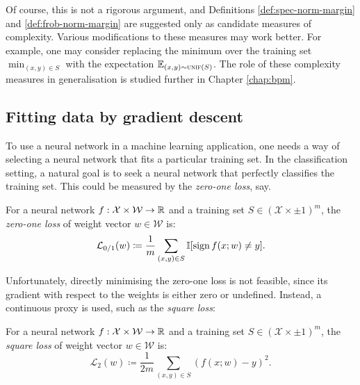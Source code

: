 \begin{refsection}
Of course, this is not a rigorous argument, and Definitions \ref{def:spec-norm-margin} and \ref{def:frob-norm-margin} are suggested only as candidate measures of complexity. Various modifications to these measures may work better. For example, one may consider replacing the minimum over the training set $\min_{(x,y)\in S}$ with the expectation $\operatorname{\mathbb{E}}_{(x,y)\sim\textsc{unif}(S)}$. The role of these complexity measures in generalisation is studied further in Chapter \ref{chap:bpm}.

\subsection{Fitting data by gradient descent}

To use a neural network in a machine learning application, one needs a way of selecting a neural network that fits a particular training set. In the classification setting, a natural goal is to seek a neural network that perfectly classifies the training set. This could be measured by the \textit{zero-one loss}, say.

\begin{definition}\label{def:zero-one-loss} For a neural network $f:\mathcal{X}\times\mathcal{W}\to\mathbb{R}$ and a training set $S\in(\mathcal{X}\times \pm 1)^m$, the \textit{zero-one loss} of weight vector $w\in\mathcal{W}$ is:
\begin{equation}
    \mathcal{L}_{0/1}(w) \coloneqq \frac{1}{m}\sum_{(x,y)\in S} \mathbb{I}[\operatorname{sign} f(x;w) \neq y].
\end{equation}
\end{definition}

Unfortunately, directly minimising the zero-one loss is not feasible, since its gradient with respect to the weights is either zero or undefined. Instead, a continuous proxy is used, such as the \textit{square loss}:

\begin{definition}\label{def:sq-loss} For a neural network $f:\mathcal{X}\times\mathcal{W}\to\mathbb{R}$ and a training set $S\in(\mathcal{X}\times \pm 1)^m$, the \textit{square loss} of weight vector $w\in\mathcal{W}$ is:
\begin{equation}
    \mathcal{L}_2(w) \coloneqq \frac{1}{2m}\sum_{(x,y)\in S} \left(f(x;w) - y\right)^2.
\end{equation}
\end{definition}


\end{refsection}
